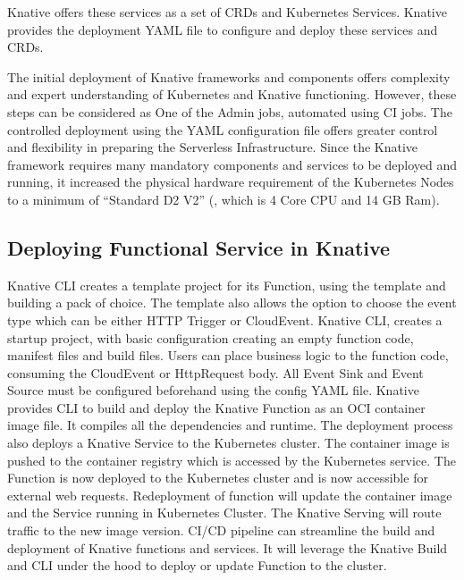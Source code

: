 \documentclass[12pt]{article}
\begin{document}
\begin{flushleft}
Knative offers these services as a set of CRDs and Kubernetes Services. Knative provides the deployment YAML file to configure and deploy these services and CRDs. 

The initial deployment of Knative frameworks and components offers complexity and expert understanding of Kubernetes and Knative functioning. However, these steps can be considered as One of the Admin jobs, automated using CI jobs. The controlled deployment using the YAML configuration file offers greater control and flexibility in preparing the Serverless Infrastructure.
Since the Knative framework requires many mandatory components and services to be deployed and running, it increased the physical hardware requirement of the Kubernetes Nodes to a minimum of “Standard D2 V2” (, which is 4 Core CPU and 14 GB Ram). 

\subsection{Deploying Functional Service in Knative}
Knative CLI creates a template project for its Function, using the template and building a pack of choice. The template also allows the option to choose the event type which can be either HTTP Trigger or CloudEvent. 
Knative CLI, creates a startup project, with basic configuration creating an empty function code, manifest files and build files. Users can place business logic to the function code, consuming the CloudEvent or HttpRequest body. All Event Sink and Event Source must be configured beforehand using the config YAML file.
Knative provides CLI to build and deploy the Knative Function as an OCI container image file. It compiles all the dependencies and runtime. The deployment process also deploys a Knative Service to the Kubernetes cluster. The container image is pushed to the container registry which is accessed by the Kubernetes service. The Function is now deployed to the Kubernetes cluster and is now accessible for external web requests. Redeployment of function will update the container image and the Service running in Kubernetes Cluster. The Knative Serving will route traffic to the new image version. 
CI/CD pipeline can streamline the build and deployment of Knative functions and services. It will leverage the Knative Build and CLI under the hood to deploy or update Function to the cluster.


\end{flushleft}
\end{document}
